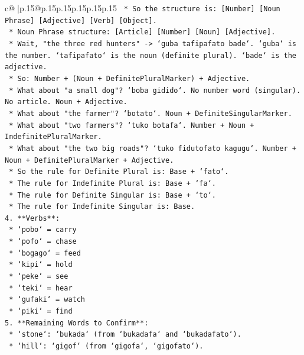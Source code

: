 \documentclass{article}
\begin{document}
{\begin{supertabular}{c@{$\;$}|p{.15\linewidth}@{}p{.15\linewidth}p{.15\linewidth}p{.15\linewidth}p{.15\linewidth}p{.15\linewidth}}
{{{\texttt{    *   So the structure is: {[}Number{]} {[}Noun Phrase{]} {[}Adjective{]} {[}Verb{]} {[}Object{]}.} \\
\texttt{    *   Noun Phrase structure: {[}Article{]} {[}Number{]} {[}Noun{]} {[}Adjective{]}.} \\
\texttt{    *   Wait, "the three red hunters" {-}> `guba tafipafato bade`. `guba` is the number. `tafipafato` is the noun (definite plural). `bade` is the adjective.} \\
\texttt{    *   So: Number + (Noun + DefinitePluralMarker) + Adjective.} \\
\texttt{    *   What about "a small dog"? `boba gidido`. No number word (singular). No article. Noun + Adjective.} \\
\texttt{    *   What about "the farmer"? `botato`. Noun + DefiniteSingularMarker.} \\
\texttt{    *   What about "two farmers"? `tuko botafa`. Number + Noun + IndefinitePluralMarker.} \\
\texttt{    *   What about "the two big roads"? `tuko fidutofato kagugu`. Number + Noun + DefinitePluralMarker + Adjective.} \\
\texttt{    *   So the rule for Definite Plural is: Base + `fato`.} \\
\texttt{    *   The rule for Indefinite Plural is: Base + `fa`.} \\
\texttt{    *   The rule for Definite Singular is: Base + `to`.} \\
\texttt{    *   The rule for Indefinite Singular is: Base.} \\
\texttt{4.  **Verbs**:} \\
\texttt{    *   `pobo` = carry} \\
\texttt{    *   `pofo` = chase} \\
\texttt{    *   `bogago` = feed} \\
\texttt{    *   `kipi` = hold} \\
\texttt{    *   `peke` = see} \\
\texttt{    *   `teki` = hear} \\
\texttt{    *   `gufaki` = watch} \\
\texttt{    *   `piki` = find} \\
\texttt{5.  **Remaining Words to Confirm**:} \\
\texttt{    *   `stone`: `bukada` (from `bukadafa` and `bukadafato`).} \\
\texttt{    *   `hill`: `gigof` (from `gigofa`, `gigofato`).} \\
}}}
\end{supertabular}}
\end{document}
